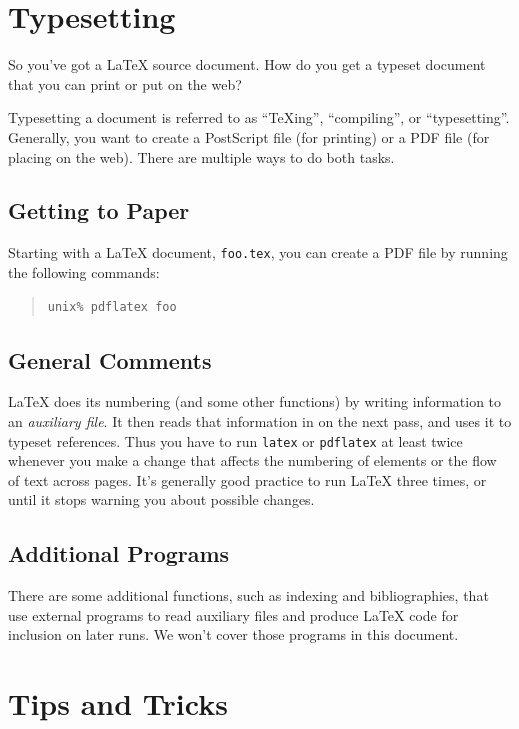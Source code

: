 \documentclass{icmmcm}
\newcommand{\file}[1]{\texttt{#1}\xspace}
\newcommand{\key}[1]{\textsf{\emph{#1}}\xspace}
\newcommand{\prog}[1]{\texttt{#1}\xspace}
\newcommand{\tex}{\TeX\xspace}
\newcommand{\latex}{\LaTeX\xspace}
\begin{document}
{\section{Typesetting}%
\label{sec:typesetting}

So you've got a \latex source document.  How do you get a typeset
document that you can print or put on the web?

Typesetting a document is referred to as ``\tex{}ing'', ``compiling'',
or ``typesetting''.  Generally, you want to create a PostScript file
(for printing) or a PDF file (for placing on the web).  There are
multiple ways to do both tasks.


\subsection{Getting to Paper}

Starting with a \latex document, \file{foo.tex}, you can create a
PDF file by running the following commands:
\begin{quote}
\begin{verbatim}
unix% pdflatex foo
\end{verbatim}
\end{quote}


\subsection{General Comments}

\latex does its numbering (and some other functions) by writing
information to an \key{auxiliary file}.  It then reads that
information in on the next pass, and uses it to typeset references.
Thus you have to run \prog{latex} or \prog{pdflatex} at least twice
whenever you make a change that affects the numbering of elements or
the flow of text across pages.  It's generally good practice to run
\latex three times, or until it stops warning you about possible
changes.

\subsection{Additional Programs}

There are some additional functions, such as indexing and
bibliographies, that use external programs to read auxiliary files and
produce \latex code for inclusion on later runs.  We won't cover those
programs in this document.


\section{Tips and Tricks}

}
\end{document}
